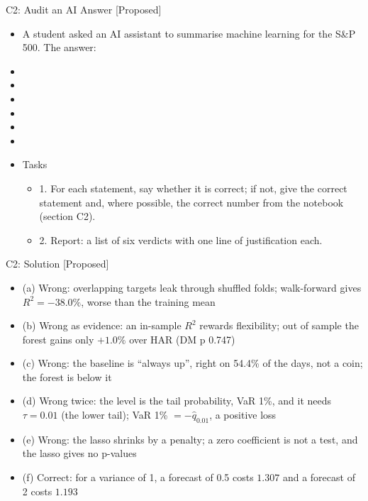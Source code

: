 \begin{frame}{C2: Audit an AI Answer [Proposed]}
\itemsize{\scriptsize}
\begin{itemize}
    \item A student asked an AI assistant to summarise machine learning for the S\&P 500. The answer:
    \item {}
    \item {}
    \item {}
    \item {}
    \item {}
    \item {}
    \item Tasks
    \begin{itemize}
        \item 1. For each statement, say whether it is correct; if not, give the correct statement and, where possible, the correct number from the notebook (section C2).
        \item 2. Report: a list of six verdicts with one line of justification each.
    \end{itemize}
\end{itemize}
\end{frame}

\ifsolutions
\begin{frame}{C2: Solution [Proposed]}
\itemsize{\footnotesize}
\begin{itemize}
    \item (a) Wrong: overlapping targets leak through shuffled folds; walk-forward gives $R^2 = -38.0\%$, worse than the training mean
    \item (b) Wrong as evidence: an in-sample $R^2$ rewards flexibility; out of sample the forest gains only $+1.0\%$ over HAR (DM p 0.747)
    \item (c) Wrong: the baseline is ``always up'', right on 54.4\% of the days, not a coin; the forest is below it
    \item (d) Wrong twice: the level is the tail probability, VaR 1\%, and it needs $\tau = 0.01$ (the lower tail); VaR 1\% $= -\hat q_{0.01}$, a positive loss
    \item (e) Wrong: the lasso shrinks by a penalty; a zero coefficient is not a test, and the lasso gives no p-values
    \item (f) Correct: for a variance of 1, a forecast of 0.5 costs $1.307$ and a forecast of 2 costs $1.193$
\end{itemize}
\end{frame}
\fi


